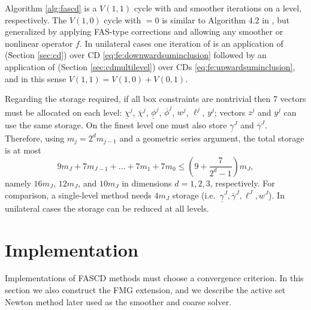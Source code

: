 \documentclass[review,hidelinks,onefignum,onetabnum]{siamart220329}
\begin{document}
Algorithm \ref{alg:fascd} is a $V(1,1)$ cycle with  and  smoother iterations on a level, respectively.  The $V(1,0)$ cycle with  $=0$ is similar to Algorithm 4.2 in \cite{GraeserKornhuber2009}, but generalized by applying FAS-type corrections and allowing any smoother or nonlinear operator $f$.  In unilateral cases one iteration of  is an application of  (Section \ref{sec:cd}) over CD \eqref{eq:fe:downwardsuminclusion} followed by an application of  (Section \ref{sec:cdmultilevel}) over CDs \eqref{eq:fe:upwardsuminclusion}, and in this sense $V(1,1)=V(1,0)+V(0,1)$.

Regarding the storage required, if all box constraints are nontrivial then 7 vectors must be allocated on each level: $\underline{\chi}^j$, $\overline{\chi}^j$, $\underline{\phi}^j$, $\overline{\phi}^j$, $w^j$, $\ell^j$, $y^j$; vectors $z^j$ and $y^j$ can use the same storage.  On the finest level one must also store $\underline{\gamma}^J$ and $\overline{\gamma}^J$.  Therefore, using $m_j=2^d m_{j-1}$ and a geometric series argument, the total storage is at most
\begin{equation}
9 m_J + 7 m_{J-1} + \dots + 7 m_1 + 7 m_0 \le \left(9 + \frac{7}{2^d - 1}\right) m_J,
\end{equation}
namely $16m_J$, $12m_J$, and $10m_J$ in dimensions $d=1,2,3$, respectively.  For comparison, a single-level method needs $4 m_J$ storage (i.e.~$\underline{\gamma}^J,\overline{\gamma}^J,\ell^J,w^J$).  In unilateral cases the storage can be reduced at all levels.


\section{Implementation} \label{sec:implementation}

Implementations of FASCD methods must choose a convergence criterion.  In this section we also construct the FMG extension, and we describe the active set Newton method later used as the smoother and coarse solver.
\end{document}
